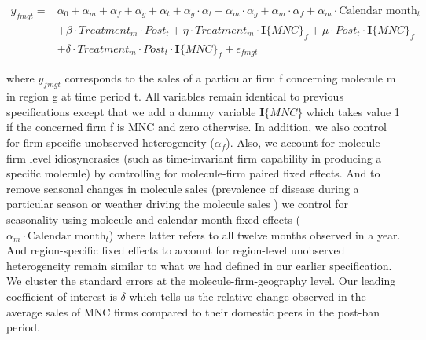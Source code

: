 \documentclass[AER]{AEA}
\theoremstyle{theorem}
\begin{document}
\begin{equation}\label{Eq_5}
	\begin{aligned}
		y_{fmgt} =& \alpha_{0} + \alpha_{m} + \alpha_{f}  + \alpha_{g} + \alpha_{t}  + \alpha_{g}\cdot\alpha_{t} + \alpha_{m} \cdot \alpha_{g} + \alpha_{m}\cdot\alpha_{f} + \alpha_{m}\cdot \text{Calendar month}_{t} \\
		 &+ \beta \cdot Treatment_{m} \cdot Post_{t}  + \eta \cdot Treatment_{m} \cdot \mathbf{I}\{MNC\}_{f} + \mu \cdot Post_{t} \cdot \mathbf{I}\{MNC\}_{f}  \\
		& + \delta \cdot Treatment_{m} \cdot Post_{t} \cdot \mathbf{I}\{MNC\}_{f} + \epsilon_{fmgt}
	\end{aligned}
\end{equation}

where $y_{fmgt}$ corresponds to the sales of a particular firm f concerning molecule m in region g at time period t. All variables remain identical to previous specifications except that we add a dummy variable $\mathbf{I}\{MNC\}$ which takes value 1 if the concerned firm f is MNC and zero otherwise. In addition, we also control for firm-specific unobserved heterogeneity ($\alpha_{f}$). Also, we account for molecule-firm level idiosyncrasies (such as time-invariant firm capability in producing a specific molecule) by controlling for  molecule-firm paired fixed effects. And to remove seasonal changes in molecule sales (prevalence of disease during a particular season or weather driving the molecule sales ) we control for seasonality using molecule and calendar month fixed effects ($\alpha_{m}\cdot \text{Calendar month}_{t}$) where latter refers to all twelve months observed in a year. And region-specific fixed effects to account for region-level unobserved heterogeneity remain similar to what we  had defined in our earlier specification. We cluster the standard errors at the molecule-firm-geography level. Our leading coefficient of interest is $\delta$ which tells us the  relative change observed in the average sales of MNC firms compared to their domestic peers in the post-ban period.
\end{document}
